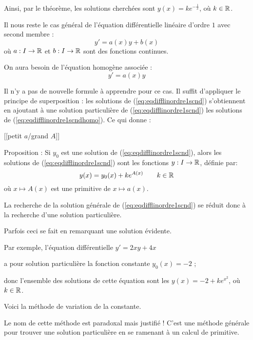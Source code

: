 \change
Ainsi, par le théorème, les solutions cherchées sont 
$y(x) = k e^{-\frac1x}$, où $k\in\mathbb{R}$.



\diapo


Il nous reste le cas général de l'équation différentielle linéaire d'ordre $1$ avec second membre :
\begin{equation}
   y' = a(x) y  + b(x)
  \label{eq:eqdifflinordre1scnd}
  \tag{$E$}
\end{equation}
où $a : I \to \mathbb{R}$ et $b: I \to \mathbb{R}$ sont des fonctions continues.

\change
On aura besoin de l'équation homogène associée :
\begin{equation}
   y' = a(x) y
  \label{eq:eqdifflinordre1scndhomo}
  \tag{$E_0$}
\end{equation}

\change
Il n'y a pas de nouvelle formule à apprendre pour ce cas.
Il suffit d'appliquer le principe de superposition : 
les solutions de (\ref{eq:eqdifflinordre1scnd}) s'obtiennent en
ajoutant à une solution particulière de (\ref{eq:eqdifflinordre1scnd}) les solutions de
(\ref{eq:eqdifflinordre1scndhomo}).
Ce qui donne :


[[petit $a$/grand $A$]]

Proposition : 
Si $y_0$ est une solution de (\ref{eq:eqdifflinordre1scnd}), 
alors les solutions de (\ref{eq:eqdifflinordre1scnd}) sont les
fonctions $y : I \to \mathbb{R}$, définie par: 
$$y(x)= y_0(x)+k e^{A(x)} \qquad k \in \mathbb{R}$$
où $x\mapsto A(x)$ est une primitive de $x \mapsto a(x)$.

\change

La recherche de la solution générale 
de (\ref{eq:eqdifflinordre1scnd}) se réduit 
donc à la recherche d'une solution particulière. 

Parfois ceci 
se fait en remarquant une solution évidente. 

\change
Par exemple, l'équation différentielle $y'=2xy+4x$

\change
a pour solution particulière la fonction constante $y_0(x)=-2$ ;

\change
donc l'ensemble des solutions de cette équation sont les 
$y(x) = -2 + ke^{x^2}$, où $k\in\mathbb{R}$.

\diapo

Voici la méthode de variation de la constante.

Le nom de cette méthode est paradoxal mais justifié !
C'est une méthode générale pour trouver une solution 
particulière en se ramenant à un calcul de primitive.

